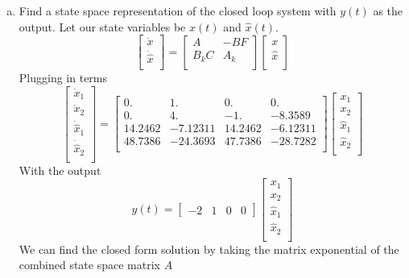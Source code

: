 \documentclass{article}
\begin{document}
\begin{enumerate}[(a)]
\item Find a state space representation of the closed loop system with $y(t)$ as the output.
\newline
Let our state variables be $x(t)$ and $\hat{x}(t)$.
$$
\begin{bmatrix}
\dot{x} \\
\dot{\hat{x}} \\
\end{bmatrix}
=
\begin{bmatrix}
A & -BF \\
B_kC & A_k \\
\end{bmatrix}
\begin{bmatrix}
x\\
\hat{x} \\
\end{bmatrix}
$$
Plugging in terms
$$
\begin{bmatrix}
\dot{x}_1 \\
\dot{x}_2 \\
\dot{\hat{x}}_1 \\
\dot{\hat{x}}_2 \\
\end{bmatrix}
=
\begin{bmatrix}
0. & 1. & 0. & 0. \\
0. & 4. & -1. & -8.3589 \\
14.2462 & -7.12311 & 14.2462 & -6.12311 \\
48.7386 & -24.3693 & 47.7386 & -28.7282 \\
\end{bmatrix}
\begin{bmatrix}
x_1 \\
x_2 \\
\hat{x}_1 \\
\hat{x}_2 \\
\end{bmatrix}
$$
With the output
$$
y(t) =
\begin{bmatrix}
-2 & 1 & 0 & 0
\end{bmatrix}
\begin{bmatrix}
x_1 \\
x_2 \\
\hat{x}_1 \\
\hat{x}_2 \\
\end{bmatrix}
$$
We can find the closed form solution by taking the matrix exponential of the combined state space matrix $A$


\end{enumerate}
\end{document}
